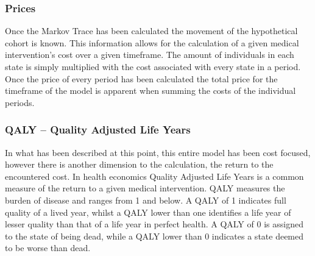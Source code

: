 \documentclass[a4paper,12pt]{article}
\begin{document}
\subsubsection*{Prices}
Once the Markov Trace has been calculated the movement of the hypothetical cohort is known. This information allows for the calculation of a given medical intervention’s cost over a given timeframe. The amount of individuals in each state is simply multiplied with the cost associated with every state in a period. Once the price of every period has been calculated the total price for the timeframe of the model is apparent when summing the costs of the individual periods.

\subsubsection*{QALY – Quality Adjusted Life Years}
In what has been described at this point, this entire model has been cost focused, however there is another dimension to the calculation, the return to the encountered cost. In health economics Quality Adjusted Life Years is a common measure of the return to a given medical intervention. QALY measures the burden of disease and ranges from 1 and below. A QALY of 1 indicates full quality of a lived year, whilst a QALY lower than one identifies a life year of lesser quality than that of a life year in perfect health. A QALY of 0 is assigned to the state of being dead, while a QALY lower than 0 indicates a state deemed to be worse than dead. 
\end{document}
